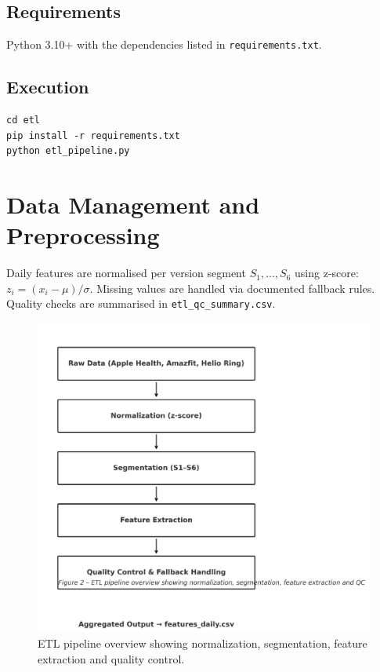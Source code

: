 \documentclass[12pt,a4paper]{article}
\begin{document}
\subsection{Requirements}
Python 3.10+ with the dependencies listed in \texttt{requirements.txt}.

\subsection{Execution}
\begin{verbatim}
cd etl
pip install -r requirements.txt
python etl_pipeline.py
\end{verbatim}

\section{Data Management and Preprocessing}
Daily features are normalised per version segment $S_1,\ldots,S_6$ using z-score: $z_i = (x_i-\mu)/\sigma$. Missing values are handled via documented fallback rules. Quality checks are summarised in \texttt{etl\_qc\_summary.csv}.

\begin{figure}[H]
  \centering
  \includegraphics[width=0.75\linewidth]{docs/figures/etl-pipeline-paper.png}
  \caption{ETL pipeline overview showing normalization, segmentation, feature extraction and quality control.}
  \label{fig:etl-pipeline}
\end{figure}


\end{document}
